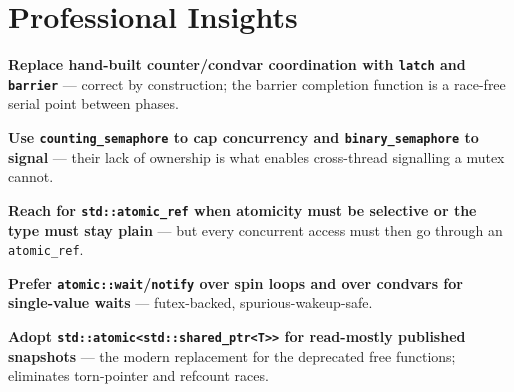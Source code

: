 \section{Professional Insights}
\label{sec:c20-concurrency2-insights}

\textbf{Replace hand-built counter/condvar coordination with \texttt{latch} and \texttt{barrier}} --- correct by construction; the barrier completion function is a race-free serial point between phases.

\textbf{Use \texttt{counting\_semaphore} to cap concurrency and \texttt{binary\_semaphore} to signal} --- their lack of ownership is what enables cross-thread signalling a mutex cannot.

\textbf{Reach for \texttt{std::atomic\_ref} when atomicity must be selective or the type must stay plain} --- but every concurrent access must then go through an \texttt{atomic\_ref}.

\textbf{Prefer \texttt{atomic::wait}/\texttt{notify} over spin loops and over condvars for single-value waits} --- futex-backed, spurious-wakeup-safe.

\textbf{Adopt \texttt{std::atomic<std::shared\_ptr<T>>} for read-mostly published snapshots} --- the modern replacement for the deprecated free functions; eliminates torn-pointer and refcount races.
